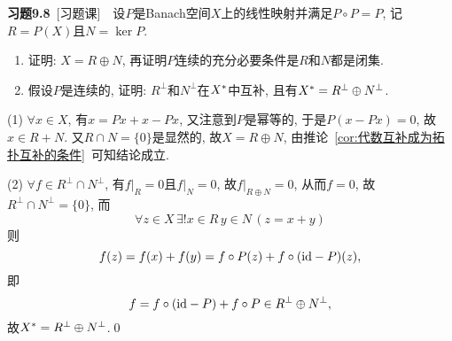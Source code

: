 	\textbf{习题9.8}\ [习题课]\ \ 设$ P $是Banach空间$ X $上的线性映射并满足$ P\circ P=P $, 记$ R=P(X) $且$ N=\ker P $.
	\begin{enumerate}[(1)]
	\item 证明: $ X=R\oplus N $, 再证明$ P $连续的充分必要条件是$ R $和$ N $都是闭集.
	\item 假设$ P $是连续的, 证明: $ R^\bot $和$ N^\bot $在$ X^{*} $中互补, 且有$ X^{*}=R^\bot\oplus N^\bot $.
	\end{enumerate}
	\begin{Proof}
	(1) $ \forall x\in X $, 有$ x=Px+x-Px $, 又注意到$ P $是幂等的, 于是$ P(x-Px)=0 $, 故$ x\in R+N $. 又$ R\cap N=\{0\} $是显然的, 故$ X=R\oplus N $, 由推论~\ref{cor:代数互补成为拓扑互补的条件}~可知结论成立.
	
	(2) $ \forall f\in R^\bot\cap N^\bot $, 有$ f|_R=0 $且$ f|_N=0 $, 故$ f|_{R\oplus N}=0 $, 从而$ f=0 $, 故$ R^\bot\cap N^\bot =\{0\} $, 而
	\[
	\forall z\in X\,\exists!x\in R\,y\in N\,(z=x+y)
	\]
	则
	\[
	f(z)=f(x)+f(y)=f\circ P(z)+f\circ(\mathrm{id}-P)(z),
	\]
	即
	\[
	f=f\circ(\mathrm{id}-P)+f\circ P\in R^\bot\oplus N^\bot,
	\]
	故$ X^{*}=R^\bot\oplus N^\bot $.\qed
	\end{Proof}

